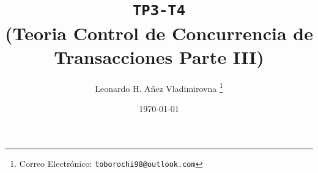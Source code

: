 

\title{\texttt{TP3-T4} \\ (Teoria Control de Concurrencia de Transacciones Parte III)}

\author{Leonardo H. Añez Vladimirovna%
  \thanks{Correo Electrónico: \texttt{toborochi98@outlook.com}}}
\date{\today}

\maketitle




